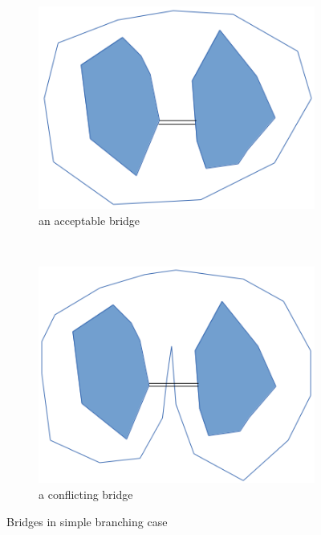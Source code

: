 \documentclass[3p,times]{elsarticle}
\begin{document}
\begin{figure}[ht]
\centering
\begin{subfigure}[b]{0.2\textwidth}
\includegraphics[width=\textwidth]{../picture/bridge-non-conflict.png}
\caption{an acceptable bridge}
\label{fig:bridge-nc}
\end{subfigure}%
~~~~~~~~~~~~~~~~~~~~~~~~~~~~~~~~~~~~~~~~~~~~%
\begin{subfigure}[b]{0.2\textwidth}
\includegraphics[width=\textwidth]{../picture/bridge-conflict.png}
\caption{a conflicting bridge}
\label{fig:bridge-c}
\end{subfigure}

\caption{Bridges in simple branching case}
\label{fig:bridges}
\end{figure}
\end{document}
